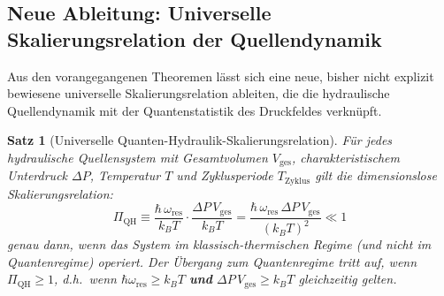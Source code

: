 ﻿\documentclass[12pt,a4paper]{report}
\newtheorem{theorem}{Satz}[chapter]
\begin{document}
\subsection{Neue Ableitung: Universelle Skalierungsrelation der Quellendynamik}

Aus den vorangegangenen Theoremen lässt sich eine neue, bisher nicht explizit bewiesene universelle Skalierungsrelation ableiten, die die hydraulische Quellendynamik mit der Quantenstatistik des Druckfeldes verknüpft.

\begin{theorem}[Universelle Quanten-Hydraulik-Skalierungsrelation]
	\label{thm:skalierung}
	Für jedes hydraulische Quellensystem mit Gesamtvolumen $V_\mathrm{ges}$, charakteristischem Unterdruck $\Delta P$, Temperatur $T$ und Zyklusperiode $T_\mathrm{Zyklus}$ gilt die dimensionslose Skalierungsrelation:
	\begin{equation}
		\Pi_\mathrm{QH} \equiv \frac{\hbar\,\omega_\mathrm{res}}{k_BT} \cdot \frac{\Delta P\,V_\mathrm{ges}}{k_BT} = \frac{\hbar\,\omega_\mathrm{res}\,\Delta P\,V_\mathrm{ges}}{(k_BT)^2} \ll 1
		\label{eq:pi_qh}
	\end{equation}
	genau dann, wenn das System im klassisch-thermischen Regime (und nicht im Quantenregime) operiert. Der Übergang zum Quantenregime tritt auf, wenn $\Pi_\mathrm{QH} \geq 1$, d.h.\ wenn $\hbar\omega_\mathrm{res} \geq k_BT$ \textbf{und} $\Delta P\,V_\mathrm{ges} \geq k_BT$ gleichzeitig gelten.
\end{theorem}
\end{document}
